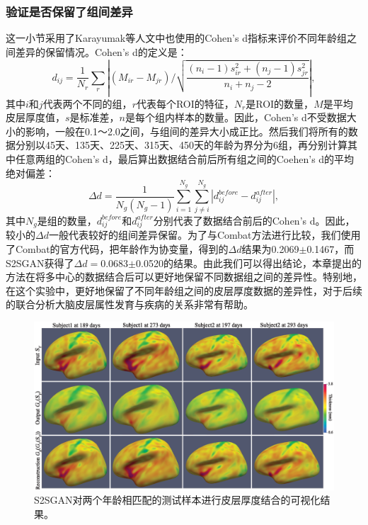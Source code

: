 \subsubsection{验证是否保留了组间差异}
这一小节采用了Karayumak等人\cite{karayumak2019retrospective}文中也使用的Cohen's d指标来评价不同年龄组之间差异的保留情况。Cohen's d的定义是：
\begin{equation}
 {d_{ij}} = \frac{1}{{{N_r}}}\sum\limits_r {\left| {({M_{ir}} - {M_{jr}})/\sqrt {\frac{{({n_i} - 1)s_{ir}^2 + ({n_j} - 1)s_{jr}^2}}{{{n_i} + {n_j} - 2}}} } \right|},
\end{equation}
其中$i$和$j$代表两个不同的组，$r$代表每个ROI的特征，$N_r$是ROI的数量，$M$是平均皮层厚度值，$s$是标准差，$n$是每个组内样本的数量。因此，Cohen's d不受数据大小的影响，一般在0.1～2.0之间，与组间的差异大小成正比。然后我们将所有的数据分别以45天、135天、225天、315天、450天的年龄为界分为6组，再分别计算其中任意两组的Cohen's d，最后算出数据结合前后所有组之间的Coehen's d的平均绝对偏差：
\begin{equation}
     \Delta d = \frac{1}{{{N_g}({N_g} - 1)}}\sum\limits_{i = 1}^{{N_g}} {\sum\limits_{j \ne i}^{{N_g}} {\left| {d_{ij}^{before} - d_{ij}^{after}} \right|} },
\end{equation}
其中$N_g$是组的数量，$d_{ij}^{before}$和$d_{ij}^{after}$分别代表了数据结合前后的Cohen's d。因此，较小的$\Delta d$一般代表较好的组间差异保留。为了与Combat方法进行比较，我们使用了Combat的官方代码，把年龄作为协变量，得到的$\Delta d$结果为0.2069$\pm$0.1467，而S2SGAN获得了$\Delta d=$0.0683$\pm$0.0520的结果。由此我们可以得出结论，本章提出的方法在将多中心的数据结合后可以更好地保留不同数据组之间的差异性。特别地，在这个实验中，更好地保留了不同年龄组之间的皮层厚度数据的差异性，对于后续的联合分析大脑皮层属性发育与疾病的关系非常有帮助。

\begin{figure}[t]
	\centering
	\includegraphics[width=\linewidth]{figure/s2sgan_examples.eps}
	\caption{S2SGAN对两个年龄相匹配的测试样本进行皮层厚度结合的可视化结果。}\label{fig:s2sgan_examples}
\end{figure} 
	
